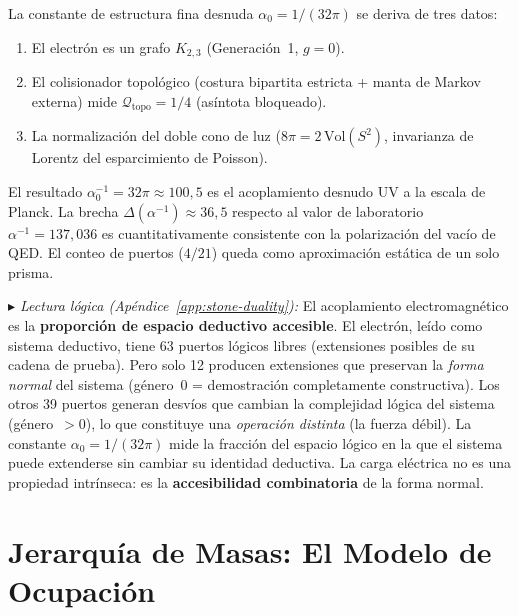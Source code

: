 \documentclass[11pt, a4paper, openany]{book}
\newcommand{\stoneref}[1]{%
  \smallskip\noindent
  {\small\color{structure!70}\textit{$\blacktriangleright$ Lectura
  l\'ogica (Ap\'endice~\ref{app:stone-duality}):} #1}%
  \smallskip}
\begin{document}
\begin{result}[title={La constante de estructura fina es una fracci\'on
topol\'ogica}]
\label{res:fine-structure}
La constante de estructura fina desnuda
$\alpha_0 = 1/(32\pi)$ se deriva de tres datos:
\begin{enumerate}
  \item El electr\'on es un grafo $K_{2,3}$ (Generaci\'on~1, $g = 0$).
  \item El colisionador topol\'ogico (costura bipartita estricta +
    manta de Markov externa) mide
    $\mathcal{Q}_{\mathrm{topo}} = 1/4$ (as\'intota bloqueado).
  \item La normalizaci\'on del doble cono de luz
    ($8\pi = 2\,\mathrm{Vol}(S^2)$, invarianza de Lorentz del
    esparcimiento de Poisson).
\end{enumerate}
El resultado $\alpha_0^{-1} = 32\pi \approx 100{,}5$ es el
acoplamiento desnudo UV a la escala de Planck. La brecha
$\Delta(\alpha^{-1}) \approx 36{,}5$ respecto al valor de
laboratorio $\alpha^{-1} = 137{,}036$ es cuantitativamente
consistente con la polarizaci\'on del vac\'io de QED.
El conteo de puertos ($4/21$) queda como aproximaci\'on est\'atica
de un solo prisma.
\end{result}

\stoneref{El acoplamiento electromagn\'etico es la \textbf{proporci\'on
de espacio deductivo accesible}. El electr\'on, le\'ido como sistema
deductivo, tiene 63 puertos l\'ogicos libres (extensiones posibles de su
cadena de prueba). Pero solo 12 producen extensiones que preservan la
\emph{forma normal} del sistema (g\'enero~0 = demostraci\'on
completamente constructiva). Los otros 39 puertos generan desv\'ios
que cambian la complejidad l\'ogica del sistema (g\'enero~$> 0$), lo
que constituye una \emph{operaci\'on distinta} (la fuerza d\'ebil). La
constante $\alpha_0 = 1/(32\pi)$ mide la fracci\'on del espacio
l\'ogico en la que el sistema puede extenderse sin cambiar su identidad
deductiva. La carga el\'ectrica no es una propiedad intr\'inseca: es
la \textbf{accesibilidad combinatoria} de la forma normal.}


\section{Jerarqu\'ia de Masas: El Modelo de Ocupaci\'on}
\label{sec:mass-hierarchy}
\end{document}
